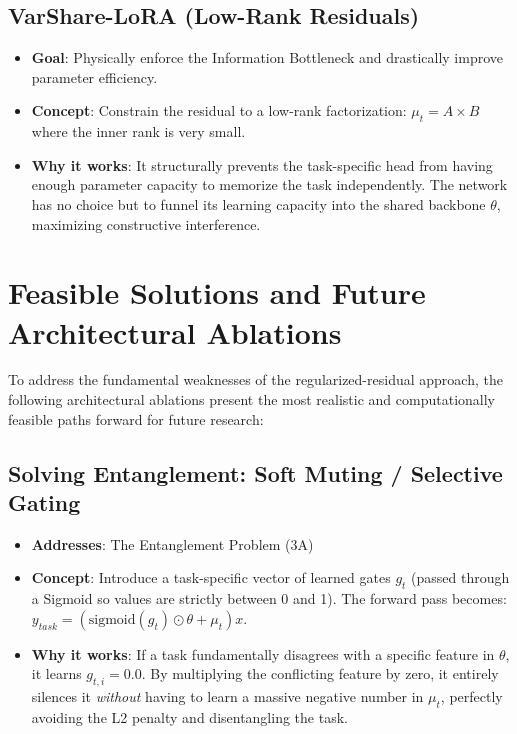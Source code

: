 \documentclass[11pt,a4paper]{article}
\begin{document}
\subsection{VarShare-LoRA (Low-Rank Residuals)}
\begin{itemize}
    \item \textbf{Goal}: Physically enforce the Information Bottleneck and drastically improve parameter efficiency.
    \item \textbf{Concept}: Constrain the residual to a low-rank factorization: $\mu_t = A \times B$ where the inner rank is very small.
    \item \textbf{Why it works}: It structurally prevents the task-specific head from having enough parameter capacity to memorize the task independently. The network has no choice but to funnel its learning capacity into the shared backbone $\theta$, maximizing constructive interference.
\end{itemize}

\section{Feasible Solutions and Future Architectural Ablations}
To address the fundamental weaknesses of the regularized-residual approach, the following architectural ablations present the most realistic and computationally feasible paths forward for future research:

\subsection{Solving Entanglement: Soft Muting / Selective Gating}
\begin{itemize}
    \item \textbf{Addresses}: The Entanglement Problem (3A)
    \item \textbf{Concept}: Introduce a task-specific vector of learned gates $g_t$ (passed through a Sigmoid so values are strictly between 0 and 1). The forward pass becomes: $y_{task} = (\text{sigmoid}(g_t) \odot \theta + \mu_t)x$.
    \item \textbf{Why it works}: If a task fundamentally disagrees with a specific feature in $\theta$, it learns $g_{t,i} = 0.0$. By multiplying the conflicting feature by zero, it entirely silences it \textit{without} having to learn a massive negative number in $\mu_t$, perfectly avoiding the L2 penalty and disentangling the task.
\end{itemize}
\end{document}
